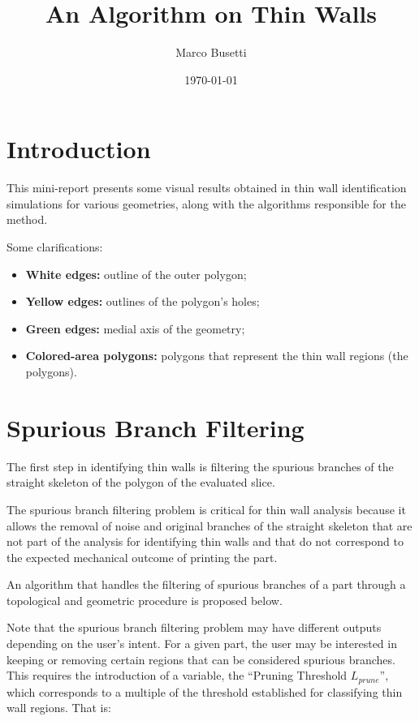 \documentclass[a4paper,11pt]{article}
\title{\vspace{-2cm} \textbf{An Algorithm on Thin Walls}}
\author{Marco Busetti}
\date{\today}
\begin{document}
\maketitle
\thispagestyle{empty}

\section*{Introduction}
This mini-report presents some visual results obtained in thin wall identification simulations for various geometries, along with the algorithms responsible for the method.

Some clarifications:

\begin{itemize}
    \item \textbf{White edges:} outline of the outer polygon;
    \item \textbf{Yellow edges:} outlines of the polygon's holes;
    \item \textbf{Green edges:} medial axis of the geometry;
    \item \textbf{Colored-area polygons:} polygons that represent the thin wall regions (the polygons).
\end{itemize}

\newpage

\section*{Spurious Branch Filtering}

The first step in identifying thin walls is filtering the spurious branches of the straight skeleton of the polygon of the evaluated slice. 

The spurious branch filtering problem is critical for thin wall analysis because it allows the removal of noise and original branches of the straight skeleton that are not part of the analysis for identifying thin walls and that do not correspond to the expected mechanical outcome of printing the part. 

An algorithm that handles the filtering of spurious branches of a part through a topological and geometric procedure is proposed below. 

Note that the spurious branch filtering problem may have different outputs depending on the user's intent. For a given part, the user may be interested in keeping or removing certain regions that can be considered spurious branches. This requires the introduction of a variable, the ``Pruning Threshold $L_{prune}$'', which corresponds to a multiple of the threshold established for classifying thin wall regions. That is: 
\end{document}
